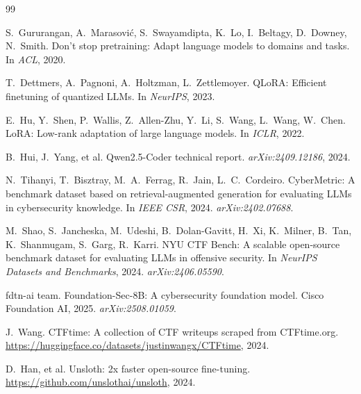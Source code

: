 \documentclass[10pt,twocolumn,a4paper]{article}
\begin{document}

\begin{thebibliography}{99}

S.~Gururangan, A.~Marasovi\'c, S.~Swayamdipta, K.~Lo, I.~Beltagy, D.~Downey, N.~Smith.
\newblock Don't stop pretraining: Adapt language models to domains and tasks.
\newblock In \emph{ACL}, 2020.

T.~Dettmers, A.~Pagnoni, A.~Holtzman, L.~Zettlemoyer.
\newblock QLoRA: Efficient finetuning of quantized LLMs.
\newblock In \emph{NeurIPS}, 2023.

E.~Hu, Y.~Shen, P.~Wallis, Z.~Allen-Zhu, Y.~Li, S.~Wang, L.~Wang, W.~Chen.
\newblock LoRA: Low-rank adaptation of large language models.
\newblock In \emph{ICLR}, 2022.

B.~Hui, J.~Yang, et al.
\newblock Qwen2.5-Coder technical report.
\newblock \emph{arXiv:2409.12186}, 2024.

N.~Tihanyi, T.~Bisztray, M.~A.~Ferrag, R.~Jain, L.~C.~Cordeiro.
\newblock CyberMetric: A benchmark dataset based on retrieval-augmented generation for evaluating LLMs in cybersecurity knowledge.
\newblock In \emph{IEEE CSR}, 2024. \emph{arXiv:2402.07688}.

M.~Shao, S.~Jancheska, M.~Udeshi, B.~Dolan-Gavitt, H.~Xi, K.~Milner, B.~Tan, K.~Shanmugam, S.~Garg, R.~Karri.
\newblock NYU CTF Bench: A scalable open-source benchmark dataset for evaluating LLMs in offensive security.
\newblock In \emph{NeurIPS Datasets and Benchmarks}, 2024. \emph{arXiv:2406.05590}.

fdtn-ai team.
\newblock Foundation-Sec-8B: A cybersecurity foundation model.
\newblock Cisco Foundation AI, 2025. \emph{arXiv:2508.01059}.

J.~Wang.
\newblock CTFtime: A collection of CTF writeups scraped from CTFtime.org.
\newblock \url{https://huggingface.co/datasets/justinwangx/CTFtime}, 2024.

D.~Han, et al.
\newblock Unsloth: 2x faster open-source fine-tuning.
\newblock \url{https://github.com/unslothai/unsloth}, 2024.

\end{thebibliography}
\end{document}
